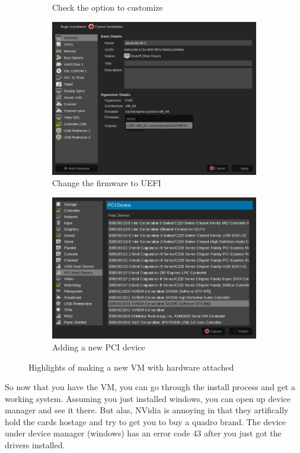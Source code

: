 \documentclass[12pt]{article}
\begin{document}
\begin{figure}[ht]
\begin{subfigure}[t]{0.4\textwidth}
		\caption{Check the option to customize}
	\end{subfigure}
	\begin{subfigure}[t]{0.4\textwidth}
		\includegraphics[width=\textwidth]{kvm_uefi.png}
		\caption{Change the firmware to UEFI}
	\end{subfigure}
	\begin{subfigure}[t]{0.4\textwidth}
		\includegraphics[width=\textwidth]{kvm_pcie.png}
		\caption{Adding a new PCI device}
	\end{subfigure}
	\caption{Highlights of making a new VM with hardware attached}
	\label{fig:kvm_gui}
\end{figure}

So now that you have the VM, you can go through the install process and get a working system.
Assuming you just installed windows, you can open up device manager and see it there.
But alas, NVidia is annoying in that they artifically hold the cards hostage and try to get you to buy a quadro brand.
The device under device manager (windows) has an error code 43 after you just got the drivers installed.
\end{document}
